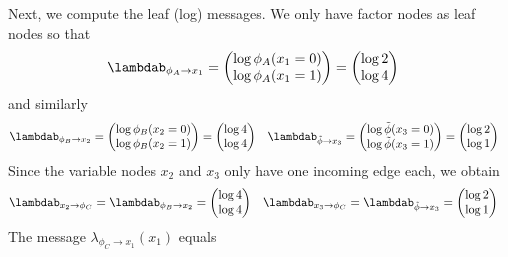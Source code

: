 \begin{exenumerate}
\begin{solution}
      Next, we compute the leaf (log) messages. We only have factor nodes as leaf nodes so that
      \begin{align}
        \lambdab_{\phi_A \to x_1} & =  \begin{pmatrix}
            \log \phi_A(x_1=0)\\
            \log \phi_A(x_1=1)
          \end{pmatrix}
          = \begin{pmatrix}
            \log 2\\
            \log 4
          \end{pmatrix}
      \end{align}
      and similarly
      \begin{align}
        \lambdab_{\phi_B \to x_2} & =   \begin{pmatrix}
            \log \phi_B(x_2=0)\\
            \log \phi_B(x_2=1)
        \end{pmatrix} = \begin{pmatrix}
          \log 4\\
          \log 4
        \end{pmatrix}
        &
        \lambdab_{\tilde{\phi} \to x_3} & =   \begin{pmatrix}
            \log \tilde{\phi}(x_3=0)\\
            \log \tilde{\phi}(x_3=1)
          \end{pmatrix}= \begin{pmatrix}
            \log 2\\
            \log 1
          \end{pmatrix}
      \end{align}
      Since the variable nodes $x_2$ and $x_3$ only have one incoming
      edge each, we obtain
      \begin{align}
        \lambdab_{x_2 \to \phi_C} = \lambdab_{\phi_B \to x_2} & =  \begin{pmatrix}
          \log 4\\
          \log 4
        \end{pmatrix}
        &
        \lambdab_{x_3 \to \phi_C} = \lambdab_{\tilde{\phi} \to x_3} & =  \begin{pmatrix}
          \log 2\\
          \log 1
        \end{pmatrix}
      \end{align}
      The message $\lambda_{\phi_C \to x_1}(x_1)$ equals
      \begin{align}

\end{align}
\end{solution}
\end{exenumerate}
